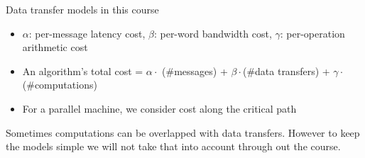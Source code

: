 \documentclass[
	12pt, %
]{beamer}
\begin{document}
\begin{frame}{Data transfer models in this course}
\begin{minipage}{0.45\linewidth}
\begin{center}
\begin{figure}
			
		\end{figure}
	\end{center}
\end{minipage}
\vfill
\begin{itemize}
	\item $\alpha$: per-message latency cost, $\beta$: per-word bandwidth cost, $\gamma$: per-operation arithmetic cost
	\item An algorithm's total cost = $\alpha \cdot$ (\#messages) + $\beta\cdot$(\#data transfers) + $\gamma \cdot$ (\#computations)
	\item For a parallel machine, we consider cost along the critical path
\end{itemize}
\vfill
{\footnotesize Sometimes computations can be overlapped with data transfers. However to keep the models simple we will not take that into account through out the course.} 

\end{frame}
\end{document}

